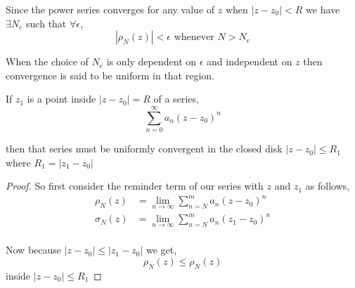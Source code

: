 Since the power series converges for any value of $z$ when $|z - z_0| < R$ we have $\exists N_e$ such that $\forall \epsilon$, 
$$ |\rho_N(z)| < \epsilon \text{ whenever } N > N_e $$ 

When the choice of $N_e$ is only dependent on $\epsilon$ and independent on $z$ then convergence is said to be uniform in that region.


\begin{theorem}
   If $z_1$ is a point inside $| z - z_0| = R$ of a series, 
   $$ \sum_{n=0}^{\infty} a_n(z - z_0)^{n} $$ 

   then that series must be uniformly convergent in the closed disk $| z- z_0| \le R_1$ where $R_1 = |z_1 - z_0|$
\end{theorem}

\begin{proof}
   So first consider the reminder term of our series with $z$ and $z_1$ as follows, 
   \begin{align*}
      \rho_N(z) &= \lim_{n \to \infty} \sum_{n=N}^{m} a_n(z - z_0)^{n}\\
      \sigma_N(z) &= \lim_{n \to \infty} \sum_{n=N}^{m} a_n(z_1 - z_0)^{n}\\
   \end{align*}

   Now because $|z - z_0| \le |z_1 - z_0|$ we get, 
   $$ \rho_N(z) \le \rho_N(z) $$ inside $|z - z_0| \le R_1$
\end{proof}
